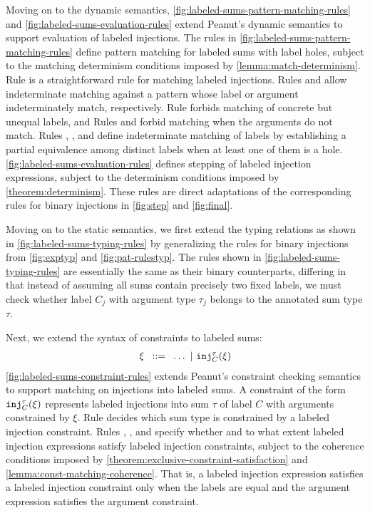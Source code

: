 
Moving on to the dynamic semantics, \autoref{fig:labeled-sums-pattern-matching-rules} and \autoref{fig:labeled-sums-evaluation-rules}
extend Peanut's dynamic semantics to support evaluation of labeled injections.
The rules in \autoref{fig:labeled-sums-pattern-matching-rules} define pattern matching for labeled sums with label holes,
subject to the matching determinism conditions imposed by \autoref{lemma:match-determinism}.
Rule \MInj is a straightforward rule for matching labeled injections.
Rules \MMInjTag and \MMInjArg allow indeterminate matching against a pattern whose label or argument indeterminately match, respectively.
Rule \NMInj forbids matching of concrete but unequal labels, and
Rules \NMInjTag and \NMInjArg forbid matching when the arguments do not match.
Rules \TMMSym, \TMMHole, and \TMMEHole define indeterminate matching of labels
by establishing a partial equivalence among distinct labels when at least one of them is a hole.
\autoref{fig:labeled-sums-evaluation-rules} defines stepping of labeled injection expressions,
subject to the determinism conditions imposed by \autoref{theorem:determinism}.
These rules are direct adaptations of the corresponding rules for binary injections in \autoref{fig:step} and \autoref{fig:final}.



Moving on to the static semantics, we first extend the typing relations as shown in \autoref{fig:labeled-sums-typing-rules}
by generalizing the rules for binary injections from \autoref{fig:exptyp} and \autoref{fig:pat-rulestyp}.
The rules shown in \autoref{fig:labeled-sums-typing-rules} are essentially the same as their binary counterparts,
differing in that instead of assuming all sums contain precisely two fixed labels,
we must check whether label $C_j$ with argument type $\tau_j$ belongs to the annotated sum type $\tau$.


Next, we extend the syntax of constraints to labeled sums:
\[
  \arraycolsep=4pt\begin{array}{lll}
    \xi & ::= & \ldots ~\vert~ \cinj{C}{\tau}{\xi}
  \end{array}
\]
\autoref{fig:labeled-sums-constraint-rules} extends Peanut's constraint checking semantics to support matching on injections into labeled sums.
A constraint of the form $\mathtt{inj}_{C}^{\tau}(\xi)$ represents labeled injections into sum $\tau$ of label $C$ with arguments constrained by $\xi$.
Rule \CTInj decides which sum type is constrained by a labeled injection constraint.
Rules \CSInj, \CMSInjTag, and \CMSInjArg specify whether and to what extent labeled injection expressions satisfy labeled injection constraints,
subject to the coherence conditions imposed by \autoref{theorem:exclusive-constraint-satisfaction} and \autoref{lemma:const-matching-coherence}.
That is, a labeled injection expression satisfies a labeled injection constraint
only when the labels are equal and the argument expression satisfies the argument constraint.

